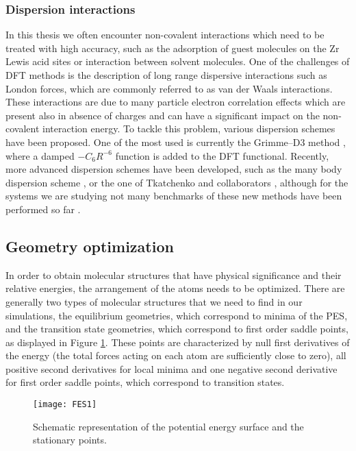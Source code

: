 \subsubsection*{Dispersion interactions}
In this thesis we often encounter non-covalent interactions which need to be treated with high accuracy, such as the adsorption of guest molecules on the Zr Lewis acid sites or interaction between solvent molecules. One of the challenges of DFT methods is the description of long range dispersive interactions such as London forces, which are commonly referred to as van der Waals interactions. These interactions are due to many particle electron correlation effects which are present also in absence of charges and can have a significant impact on the non-covalent interaction energy. To tackle this problem, various dispersion schemes have been proposed. One of the most used is currently the Grimme--D3 method \cite{Grimme2010}, where a damped $-C_{6}R^{-6}$ function is added to the DFT functional. Recently, more advanced dispersion schemes have been developed, such as the many body dispersion scheme \cite{Buko2016}, or the one of Tkatchenko and collaborators \cite{Ambrosetti2014}, although for the systems we are studying not many benchmarks of these new methods have been performed so far  \cite{Wieme2018}.

\subsection*{Geometry optimization}
In order to obtain molecular structures that have physical significance and their relative energies, the arrangement of the atoms needs to be optimized. There are generally two types of molecular structures that we need to find in our simulations, the equilibrium geometries, which correspond to minima of the PES, and the transition state geometries, which correspond to first order saddle points, as displayed in Figure \ref{fig:FES1}. These points are characterized by null first derivatives of the energy (the total forces acting on each atom are sufficiently close to zero), all positive second derivatives for local minima and one negative second derivative for first order saddle points, which correspond to transition states. 

\begin{figure}[!htbp]
	\centering
 	\texttt{[image: FES1]}
	\caption{Schematic representation of the potential energy surface and the stationary points.}
	\label{fig:FES1}
\end{figure}

